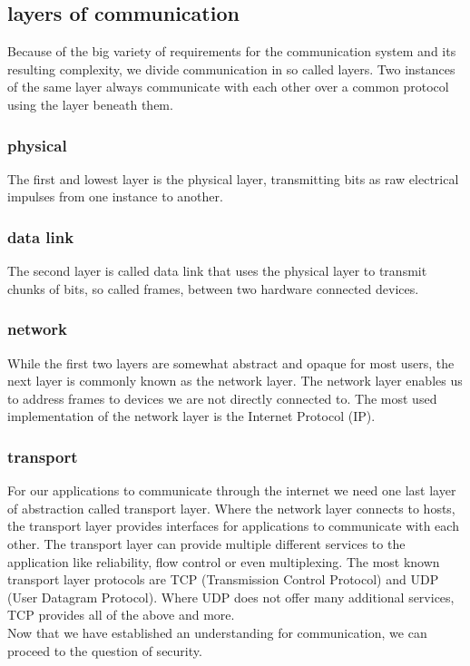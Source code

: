 \documentclass[a4paper,conference]{IEEEtran}
\begin{document}
\subsection{layers of communication}
Because of the big variety of requirements for the communication system and its resulting complexity, we divide communication in so called layers. Two instances of the same layer always communicate with each other over a common protocol using the layer beneath them.\\ %
\subsubsection{physical}
The first and lowest layer is the physical layer, transmitting bits as raw electrical impulses from one instance to another.
\subsubsection{data link}
The second layer is called data link that uses the physical layer to transmit chunks of bits, so called frames, between two {hardware} connected devices.
\subsubsection{network}
While the first two layers are somewhat abstract and opaque for most users, the next layer is commonly known as the network layer. The network layer enables us to address frames to devices we are not directly connected to. The most used implementation of the network layer is the Internet Protocol (IP).
\subsubsection{transport}
For our applications to communicate through the internet we need one last layer of abstraction called transport layer. Where the network layer connects to hosts, the transport layer provides interfaces for applications to communicate with each other. The transport layer can provide multiple different services to the application like reliability, flow control or even multiplexing. The most known transport layer protocols are TCP (Transmission Control Protocol) and UDP (User Datagram Protocol). Where UDP does not offer many additional services, TCP provides all of the above and more.\\
Now that we have established an understanding for communication, we can proceed to the question of security.
\end{document}
